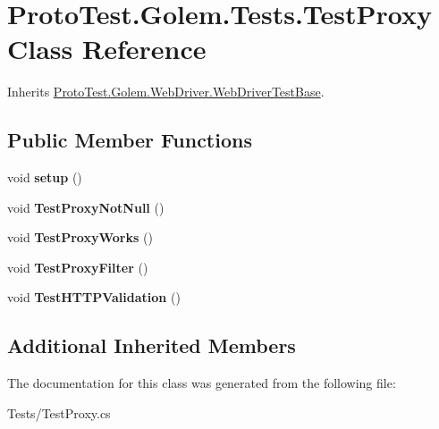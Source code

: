 \hypertarget{class_proto_test_1_1_golem_1_1_tests_1_1_test_proxy}{\section{Proto\-Test.\-Golem.\-Tests.\-Test\-Proxy Class Reference}
\label{class_proto_test_1_1_golem_1_1_tests_1_1_test_proxy}
}


Inherits \hyperlink{class_proto_test_1_1_golem_1_1_web_driver_1_1_web_driver_test_base}{Proto\-Test.\-Golem.\-Web\-Driver.\-Web\-Driver\-Test\-Base}.

\subsection*{Public Member Functions}
\begin{DoxyCompactItemize}
\item 
\hypertarget{class_proto_test_1_1_golem_1_1_tests_1_1_test_proxy_a72789e39c89ca325e46e34feba754a21}{void {\bfseries setup} ()}\label{class_proto_test_1_1_golem_1_1_tests_1_1_test_proxy_a72789e39c89ca325e46e34feba754a21}

\item 
\hypertarget{class_proto_test_1_1_golem_1_1_tests_1_1_test_proxy_a6020f8dcb788da3a829d399821351649}{void {\bfseries Test\-Proxy\-Not\-Null} ()}\label{class_proto_test_1_1_golem_1_1_tests_1_1_test_proxy_a6020f8dcb788da3a829d399821351649}

\item 
\hypertarget{class_proto_test_1_1_golem_1_1_tests_1_1_test_proxy_a6c5affef1bc388f2e0fcaa36964237e5}{void {\bfseries Test\-Proxy\-Works} ()}\label{class_proto_test_1_1_golem_1_1_tests_1_1_test_proxy_a6c5affef1bc388f2e0fcaa36964237e5}

\item 
\hypertarget{class_proto_test_1_1_golem_1_1_tests_1_1_test_proxy_a35600df250f0bd37fdaa28348995ee98}{void {\bfseries Test\-Proxy\-Filter} ()}\label{class_proto_test_1_1_golem_1_1_tests_1_1_test_proxy_a35600df250f0bd37fdaa28348995ee98}

\item 
\hypertarget{class_proto_test_1_1_golem_1_1_tests_1_1_test_proxy_a824f9d93b2a9a2b67b6a9cce3788b720}{void {\bfseries Test\-H\-T\-T\-P\-Validation} ()}\label{class_proto_test_1_1_golem_1_1_tests_1_1_test_proxy_a824f9d93b2a9a2b67b6a9cce3788b720}

\end{DoxyCompactItemize}
\subsection*{Additional Inherited Members}


The documentation for this class was generated from the following file\-:\begin{DoxyCompactItemize}
\item 
Tests/Test\-Proxy.\-cs\end{DoxyCompactItemize}
